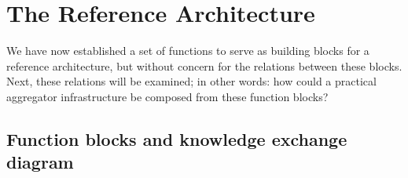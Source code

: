 






















\section{The Reference Architecture} 
\label{sec:refarch}

We have now established a set of functions to serve as building blocks for a reference architecture, but without concern for the relations between these blocks. Next, these relations will be examined; in other words: how could a practical aggregator infrastructure be composed from these function blocks?

\subsection{Function blocks and knowledge exchange diagram}


